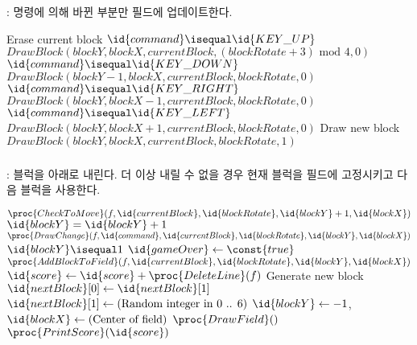 \subsubsection{}: 명령에 의해 바뀐 부분만 필드에 업데이트한다.

\begin{codebox}
\li \Comment Erase current block
\li \If $\id{command} \isequal \id{KEY\_UP}$
\li \Then $DrawBlock(blockY, blockX, currentBlock, (blockRotate+3) \mbox{ mod } 4, 0)$ \End
\li \If $\id{command} \isequal \id{KEY\_DOWN}$
\li \Then $DrawBlock(blockY - 1, blockX, currentBlock, blockRotate, 0)$ \End
\li \If $\id{command} \isequal \id{KEY\_RIGHT}$
\li \Then $DrawBlock(blockY, blockX - 1, currentBlock, blockRotate, 0)$ \End
\li \If $\id{command} \isequal \id{KEY\_LEFT}$
\li \Then $DrawBlock(blockY, blockX + 1, currentBlock, blockRotate, 0)$ \End
\li \Comment Draw new block
\li $DrawBlock(blockY, blockX, currentBlock, blockRotate, 1)$
\end{codebox}

\newpage

\subsubsection{}: 블럭을 아래로 내린다. 더 이상 내릴 수 없을 경우 현재 블럭을 필드에 고정시키고 다음 블럭을 사용한다.

\begin{codebox}
\li \If $\proc{CheckToMove}(f, \id{currentBlock}, \id{blockRotate}, \id{blockY} + 1, \id{blockX})$
\li \Then
        $\id{blockY} = \id{blockY} + 1$
\li     $\proc{DrawChange}(f, \id{command}, \id{currentBlock}, \id{blockRotate}, \id{blockY}, \id{blockX})$
\li \Else
\li     \If $\id{blockY} \isequal 1$
\li     \Then
            $\id{gameOver} \gets \const{true}$
\li     \Else
\li         $\proc{AddBlockToField}(f, \id{currentBlock}, \id{blockRotate}, \id{blockY}, \id{blockX})$
\li         $\id{score} \gets \id{score} + \proc{DeleteLine}(f)$
\li         \Comment Generate new block
\li         $\id{nextBlock}[0] \gets \id{nextBlock}[1]$
\li         $\id{nextBlock}[1] \gets (\mbox{Random integer in 0 .. 6})$
\li         $\id{blockY} \gets -1$, $\id{blockX} \gets (\mbox{Center of field})$
\li         $\proc{DrawField}()$
\li         $\proc{PrintScore}(\id{score})$
        \End
    \End
\end{codebox}

